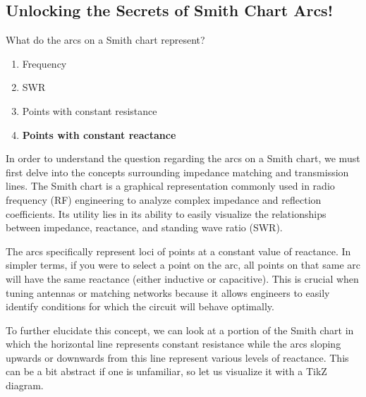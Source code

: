 \subsection{Unlocking the Secrets of Smith Chart Arcs!}

\begin{tcolorbox}[colback=gray!10, colframe=black, title=E9G10]  
What do the arcs on a Smith chart represent?  
\begin{enumerate}[label=\Alph*.]
    \item Frequency
    \item SWR
    \item Points with constant resistance
    \item \textbf{Points with constant reactance}
\end{enumerate} \end{tcolorbox}

In order to understand the question regarding the arcs on a Smith chart, we must first delve into the concepts surrounding impedance matching and transmission lines. The Smith chart is a graphical representation commonly used in radio frequency (RF) engineering to analyze complex impedance and reflection coefficients. Its utility lies in its ability to easily visualize the relationships between impedance, reactance, and standing wave ratio (SWR).

The arcs specifically represent loci of points at a constant value of reactance. In simpler terms, if you were to select a point on the arc, all points on that same arc will have the same reactance (either inductive or capacitive). This is crucial when tuning antennas or matching networks because it allows engineers to easily identify conditions for which the circuit will behave optimally.

To further elucidate this concept, we can look at a portion of the Smith chart in which the horizontal line represents constant resistance while the arcs sloping upwards or downwards from this line represent various levels of reactance. This can be a bit abstract if one is unfamiliar, so let us visualize it with a TikZ diagram.

\begin{center}
\end{center}

